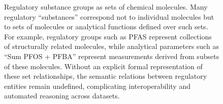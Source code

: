 \begin{figure}[H]
	\centering                                                                                                                                                                                                                                                                                                                                                                                                           
	\caption{Regulatory substance groups as sets of chemical molecules.
		Many regulatory “substances” correspond not to individual molecules but to sets of molecules or analytical functions defined over such sets. For example, regulatory groups such as PFAS represent collections of structurally related molecules, while analytical parameters such as “Sum PFOS + PFBA” represent measurements derived from subsets of these molecules. Without an explicit formal representation of these set relationships, the semantic relations between regulatory entities remain undefined, complicating interoperability and automated reasoning across datasets.} \label{fig:regulatory_groups}                                                                                                                                                                                                                                                                                                                                                                  
\end{figure}   